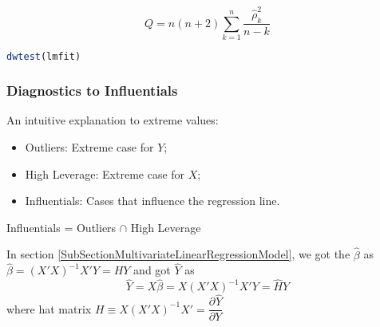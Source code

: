 \begin{itemize}[topsep=2pt,itemsep=2pt]
\begin{itemize}
        \begin{equation}
            Q=n(n+2)\sum_{k=1}^n\dfrac{\hat{\rho}_k^2}{n-k} 
        \end{equation}
        
        
    \end{itemize}

\begin{rcode}
\begin{lstlisting}[language=R]
dwtest(lmfit)
\end{lstlisting}

\end{rcode}   
        
\end{itemize}














    
        
        


\subsubsection{Diagnostics to Influentials}\label{SubSubSectionDiagnosticsToInfluentials}
    An intuitive explanation to extreme values:
    \begin{itemize}[topsep=2pt,itemsep=2pt]
        \item Outliers: Extreme case for $ Y $;
        \item High Leverage: Extreme case for $ X $;
        \item Influentials: Cases that influence the regression line.
    \end{itemize}

    \begin{point}
        Influentials = Outliers $ \cap $ High Leverage
    \end{point}
    

    In section \ref{SubSectionMultivariateLinearRegressionModel}, we got the $ \hat{\beta}  $ as $\hat{ \beta} = (X'X)^{-1}X'Y=HY $ and got $ \hat{Y} $ as 
    \begin{equation}
        \hat{Y}= X\hat{\beta }=X(X'X)^{-1}X'Y=\hat{H}Y
    \end{equation}
    where hat matrix $ H\equiv  X(X'X)^{-1}X'=\dfrac{\partial^{} \hat{Y}}{\partial Y^{}}$

